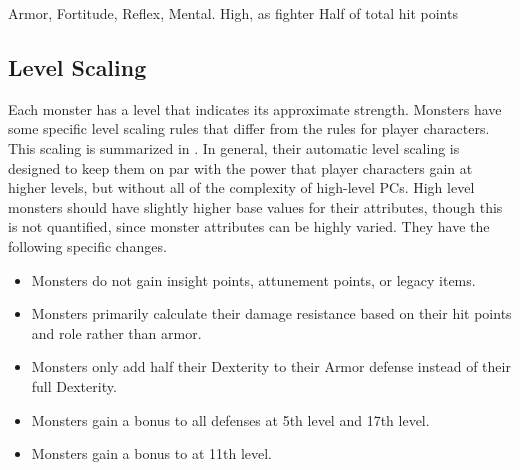               Armor,  Fortitude,  Reflex,  Mental.
             High, as fighter
             Half of total hit points

    \subsection{Level Scaling}
        Each monster has a level that indicates its approximate strength.
        Monsters have some specific level scaling rules that differ from the rules for player characters.
        This scaling is summarized in .
        In general, their automatic level scaling is designed to keep them on par with the power that player characters gain at higher levels, but without all of the complexity of high-level PCs.
        High level monsters should have slightly higher base values for their attributes, though this is not quantified, since monster attributes can be highly varied.
        They have the following specific changes.
        \begin{itemize}
            \item Monsters do not gain insight points, attunement points, or legacy items.
            \item Monsters primarily calculate their damage resistance based on their hit points and role rather than armor.
            \item Monsters only add half their Dexterity to their Armor defense instead of their full Dexterity.
            \item Monsters gain a  bonus to all defenses at 5th level and 17th level.
            \item Monsters gain a  bonus to  at 11th level.
        \end{itemize}


